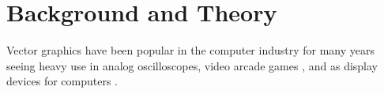\chapter{Background and Theory}

Vector graphics have been popular in the computer industry for many years seeing heavy use in analog oscilloscopes, video arcade games \cite{astroids}, and as display devices for computers \cite{ibm2250}.